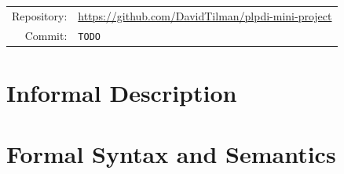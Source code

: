 \documentclass[11pt,a4paper]{article}
\title{\langname}
\author{David Tilman \\ Student ID: \studentid}
\date{\today}
\newcommand{\giturl}{https://github.com/DavidTilman/plpdi-mini-project}
\newcommand{\githash}{TODO}                     %
\begin{document}
\maketitle

\begin{center}
  \begin{tabular}{rl}
    Repository: & \url{\giturl} \\
    Commit:     & \texttt{\githash}
  \end{tabular}
\end{center}


\section{Informal Description}


\section{Formal Syntax and Semantics}
\end{document}
